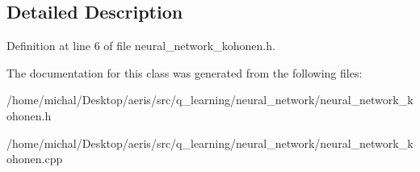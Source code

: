 \subsection{Detailed Description}


Definition at line 6 of file neural\-\_\-network\-\_\-kohonen.\-h.



The documentation for this class was generated from the following files\-:\begin{DoxyCompactItemize}
\item 
/home/michal/\-Desktop/aeris/src/q\-\_\-learning/neural\-\_\-network/neural\-\_\-network\-\_\-kohonen.\-h\item 
/home/michal/\-Desktop/aeris/src/q\-\_\-learning/neural\-\_\-network/neural\-\_\-network\-\_\-kohonen.\-cpp\end{DoxyCompactItemize}
